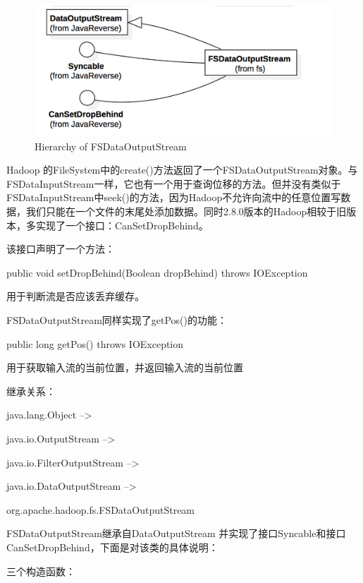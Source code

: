 \begin{figure}[h]
\centering
\includegraphics[width =1\linewidth]{2.png}
\caption{Hierarchy of FSDataOutputStream}
\label{fig:Hierarchy of FSDataOutputStream}
\end{figure}

Hadoop 的FileSystem中的create()方法返回了一个FSDataOutputStream对象。与FSDataInputStream一样，它也有一个用于查询位移的方法。但并没有类似于FSDataInputStream中seek()的方法，因为Hadoop不允许向流中的任意位置写数据，我们只能在一个文件的末尾处添加数据。同时2.8.0版本的Hadoop相较于旧版本，多实现了一个接口：CanSetDropBehind。

该接口声明了一个方法：
\begin{java}
public void setDropBehind(Boolean dropBehind) throws IOException
\end{java}
用于判断流是否应该丢弃缓存。

FSDataOutputStream同样实现了getPos()的功能：

\begin{java}
public long getPos() throws IOException
\end{java}
用于获取输入流的当前位置，并返回输入流的当前位置

继承关系：

java.lang.Object -->

java.io.OutputStream -->

java.io.FilterOutputStream -->

java.io.DataOutputStream -->

org.apache.hadoop.fs.FSDataOutputStream



FSDataOutputStream继承自DataOutputStream 并实现了接口Syncable和接口CanSetDropBehind，下面是对该类的具体说明：

三个构造函数：

